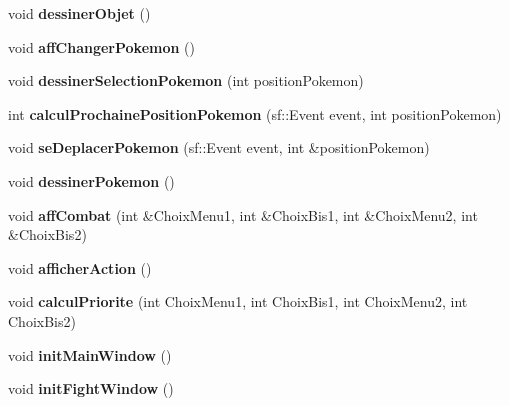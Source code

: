 \begin{DoxyCompactItemize}
\mbox{\label{class_aff_s_f_m_l_a3c90c378dfadf04e3ccd1ce829c6a28c}} 
void {\bfseries dessiner\+Objet} ()
\item 
\mbox{\label{class_aff_s_f_m_l_a4bab67761a7231c239620d8fa6c9cab9}} 
void {\bfseries aff\+Changer\+Pokemon} ()
\item 
\mbox{\label{class_aff_s_f_m_l_a3af1a502891403be2cf60707e073af78}} 
void {\bfseries dessiner\+Selection\+Pokemon} (int position\+Pokemon)
\item 
\mbox{\label{class_aff_s_f_m_l_a6a66c9a58442d45f56f2b5befda0f8c9}} 
int {\bfseries calcul\+Prochaine\+Position\+Pokemon} (sf\+::\+Event event, int position\+Pokemon)
\item 
\mbox{\label{class_aff_s_f_m_l_ae720883d2f6e2a5687f11c60d80bb74c}} 
void {\bfseries se\+Deplacer\+Pokemon} (sf\+::\+Event event, int \&position\+Pokemon)
\item 
\mbox{\label{class_aff_s_f_m_l_affef2657ba9340796d23a2a63c9ea99c}} 
void {\bfseries dessiner\+Pokemon} ()
\item 
\mbox{\label{class_aff_s_f_m_l_aeb81b8fd776be2e24b593ff7808f60ce}} 
void {\bfseries aff\+Combat} (int \&Choix\+Menu1, int \&Choix\+Bis1, int \&Choix\+Menu2, int \&Choix\+Bis2)
\item 
\mbox{\label{class_aff_s_f_m_l_aa5292138cce05645e723c57edd31abbe}} 
void {\bfseries afficher\+Action} ()
\item 
\mbox{\label{class_aff_s_f_m_l_af8db1df2164d2b0ed20fed4d0b473ec7}} 
void {\bfseries calcul\+Priorite} (int Choix\+Menu1, int Choix\+Bis1, int Choix\+Menu2, int Choix\+Bis2)
\item 
\mbox{\label{class_aff_s_f_m_l_abf8b4822bbd770f7e1b70c5a89f97268}} 
void {\bfseries init\+Main\+Window} ()
\item 
\mbox{\label{class_aff_s_f_m_l_acc7625c14a9dd8af2ed38c1e1d6250ae}} 
void {\bfseries init\+Fight\+Window} ()

\end{DoxyCompactItemize}

